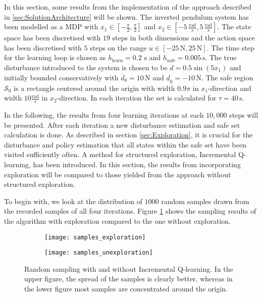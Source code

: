 \documentclass[../main.tex]{subfiles}
\begin{document}
In this section, some results from the implementation of the approach described in \ref{sec:SolutionArchitecture} will be shown. The inverted pendulum system has been modelled as a MDP with $x_1\in [-\frac{\pi}{2}, \frac{\pi}{2}] $ and $x_2 \in [-5\, \frac{\text{rad}}{s},5 \,\frac{\text{rad}}{s}] $. The state space has been discretised with $19$ steps in both dimensions and the action space has been discretised with $5$ steps on the range $u \in [-25\,\text{N},25\,\text{N}] $. The time step for the learning loop is chosen as $h_\text{learn} = 0.2\text{ s}$ and $h_\text{safe} = 0.005\,\text{s}$. The true disturbance introduced to the system is chosen to be $d = 0.5\sin(5x_1)$ and initially bounded conservatively with $\overline{d}_0 = 10 \,\text{N}$ and $\underline{d}_0 = -10 \,\text{N}$. The safe region $\mathcal{S}_0$ is a rectangle centered around the origin with width $0.9\pi$ in $x_1$-direction and width $10\frac{\text{rad}}{s}$ in $x_2$-direction. In each iteration the set is calculated for $\tau = 40\,\text{s}$.

In the following, the results from four learning iterations at each $10,000$ steps will be presented. After each iteration a new disturbance estimation and safe set calculation is done. As described in section \ref{sec:Exploration}, it is crucial for the disturbance and policy estimation that all states within the safe set have been visited sufficiently often. A method for structured exploration, Incremental Q-learning, has been introduced. In this section, the results from incorporating exploration will be compared to those yielded from the approach without structured exploration. 

To begin with, we look at the distribution of $1000$ random samples drawn from the recorded samples of all four iterations. Figure \ref{fig:samples_exploration} shows the sampling results of the algorithm with exploration compared to the one without exploration. 

\begin{figure}
    \centering
    \begin{subfigure}[b]{\textwidth}
    \texttt{[image: samples\_exploration]}
    \end{subfigure}
    
    \begin{subfigure}[b]{\textwidth}
    \texttt{[image: samples\_unexploration]}
    \end{subfigure}
        \caption{Random sampling with and without Incremental Q-learning. In the upper figure, the spread of the samples is clearly better, whereas in the lower figure most samples are concentrated around the origin.}  \label{fig:samples_exploration}
\end{figure}
\end{document}
